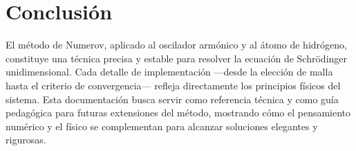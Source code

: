 \documentclass[11pt]{article}
\begin{document}
\section*{Conclusión}
El método de Numerov, aplicado al oscilador armónico y al átomo de hidrógeno,
constituye una técnica precisa y estable para resolver la ecuación de Schrödinger unidimensional.  
Cada detalle de implementación —desde la elección de malla hasta el criterio de convergencia—
refleja directamente los principios físicos del sistema.  
Esta documentación busca servir como referencia técnica y como guía pedagógica para futuras 
extensiones del método, mostrando cómo el pensamiento numérico y el físico se complementan 
para alcanzar soluciones elegantes y rigurosas.
\end{document}
